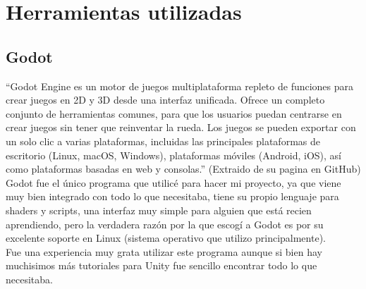 %
%

\section{Herramientas utilizadas}
\subsection{Godot}
        ``Godot Engine es un motor de juegos multiplataforma repleto de funciones para crear
        juegos en 2D y 3D desde una interfaz unificada. Ofrece un completo conjunto de herramientas comunes, para que los usuarios
        puedan centrarse en crear juegos sin tener que reinventar la rueda. Los juegos se pueden exportar con
        un solo clic a varias plataformas, incluidas las principales plataformas de escritorio (Linux, macOS, Windows),
        plataformas móviles (Android, iOS), así como plataformas basadas en web y consolas.'' (Extraido de su pagina en GitHub) \\

        Godot fue el único programa que utilicé para hacer mi proyecto, ya que viene muy bien integrado con todo lo que necesitaba, 
        tiene su propio lenguaje para shaders y scripts, una interfaz muy simple para alguien que está recien aprendiendo,
        pero la verdadera razón por la que escogí a Godot es por su excelente soporte en Linux (sistema operativo que utilizo principalmente). \\

        Fue una experiencia muy grata utilizar este programa aunque si bien hay muchisimos más tutoriales para Unity fue sencillo encontrar todo
        lo que necesitaba.
        
